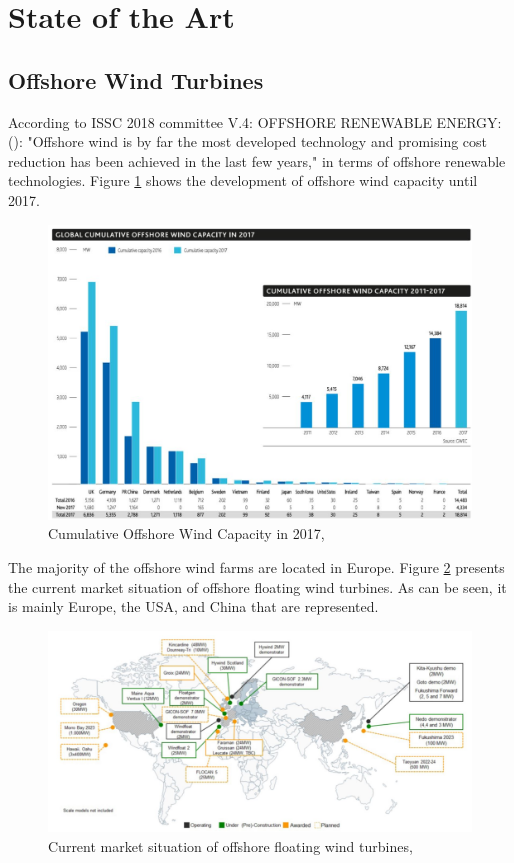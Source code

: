 \section{State of the Art}
\subsection{Offshore Wind Turbines}
According to ISSC 2018 committee V.4: OFFSHORE RENEWABLE ENERGY: (\cite{Gao2018}): "Offshore wind is by far the most developed technology and
promising cost reduction has been achieved in the last few years," in terms of offshore renewable technologies. Figure \ref{fig:sit17} shows the development of offshore wind capacity until 2017. 

\begin{figure}[H]
\centering
\includegraphics[scale=0.8]{figures/sit17}
\caption[$\; \:$Cumulative Offshore Wind Capacity in 2017]{Cumulative Offshore Wind Capacity in 2017, \cite{GWEC2018}}
 \label{fig:sit17}
\end{figure}

\noindent The majority of the offshore wind farms are located in Europe. Figure \ref{fig:world} presents the current market situation of offshore floating wind turbines. As can be seen, it is mainly Europe, the USA, and China that are represented. 


\begin{figure}[H]
\centering
\includegraphics[scale=0.54]{figures/world}
\caption[$\; \:$Current market situation of offshore floating wind turbines]{Current market situation of offshore floating wind turbines, \cite{Gao2018}}
 \label{fig:world}
\end{figure}

